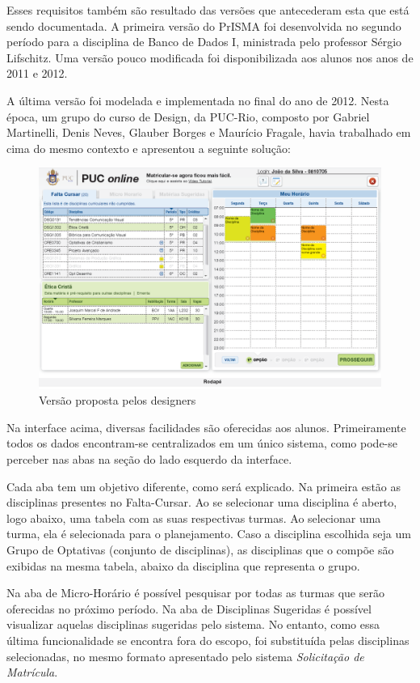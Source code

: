 \documentclass[graduacao,brazil]{ThesisPUC}
\begin{document}
Esses requisitos também são resultado das versões que antecederam esta que está sendo documentada. A primeira versão do PrISMA foi desenvolvida no segundo período para a disciplina de Banco de Dados I, ministrada pelo professor Sérgio Lifschitz. Uma versão pouco modificada foi disponibilizada aos alunos nos anos de 2011 e 2012.  

A última versão foi modelada e implementada no final do ano de 2012. Nesta época, um grupo do curso de Design, da PUC-Rio, composto por Gabriel Martinelli, Denis Neves, Glauber Borges e Maurício Fragale, havia trabalhado em cima do mesmo contexto e apresentou a seguinte solução:

\begin{figure}[H]
    \centering
    \includegraphics[width=\linewidth]{img/designer.png}
    \caption{Versão proposta pelos designers}
\end{figure}

Na interface acima, diversas facilidades são oferecidas aos alunos. Primeiramente todos os dados encontram-se centralizados em um único sistema, como pode-se perceber nas abas na seção do lado esquerdo da interface. 

Cada aba tem um objetivo diferente, como será explicado. Na primeira estão as disciplinas presentes no Falta-Cursar. Ao se selecionar uma disciplina é aberto, logo abaixo, uma tabela com as suas respectivas turmas. Ao selecionar uma turma, ela é selecionada para o planejamento. Caso a disciplina escolhida seja um Grupo de Optativas (conjunto de disciplinas), as disciplinas que o compõe são exibidas na mesma tabela, abaixo da disciplina que representa o grupo. 

Na aba de Micro-Horário é possível pesquisar por todas as turmas que serão oferecidas no próximo período. Na aba de Disciplinas Sugeridas é possível visualizar aquelas disciplinas sugeridas pelo sistema. No entanto, como essa última funcionalidade se encontra fora do escopo, foi substituída pelas disciplinas selecionadas, no mesmo formato apresentado pelo sistema \textit{Solicitação de Matrícula}.
\end{document}
